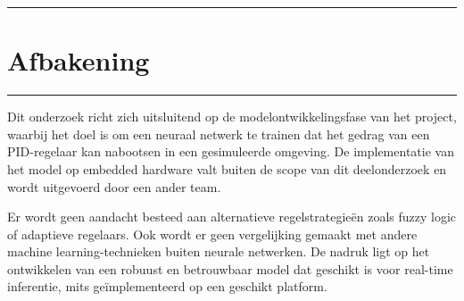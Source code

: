\vspace{0.3cm}
{\color{gray}\hrule}
\section{Afbakening}
\vspace{0.3cm}
{\color{gray}\hrule}

Dit onderzoek richt zich uitsluitend op de modelontwikkelingsfase van het project, waarbij het doel is om een neuraal netwerk te trainen dat het gedrag van een PID-regelaar kan nabootsen in een gesimuleerde omgeving. De implementatie van het model op embedded hardware valt buiten de scope van dit deelonderzoek en wordt uitgevoerd door een ander team.

Er wordt geen aandacht besteed aan alternatieve regelstrategieën zoals fuzzy logic of adaptieve regelaars. Ook wordt er geen vergelijking gemaakt met andere machine learning-technieken buiten neurale netwerken. De nadruk ligt op het ontwikkelen van een robuust en betrouwbaar model dat geschikt is voor real-time inferentie, mits geïmplementeerd op een geschikt platform.
